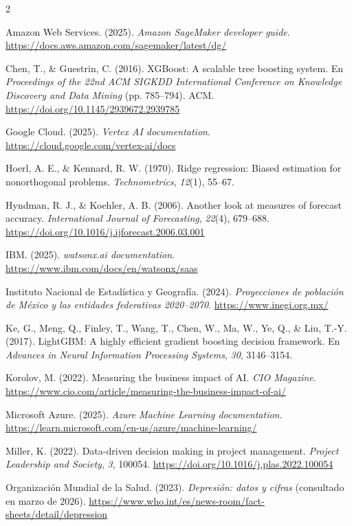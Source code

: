 \documentclass[12pt, letterpaper]{article}
\begin{document}
\begin{multicols}{2}
\small
\setlength{\parindent}{0pt}
\setlength{\hangafter}{1}
\setlength{\parskip}{6pt}
\everypar{\hangindent=1.27cm}

Amazon Web Services. (2025). \textit{Amazon SageMaker developer guide}. \url{https://docs.aws.amazon.com/sagemaker/latest/dg/}

Chen, T., \& Guestrin, C. (2016). XGBoost: A scalable tree boosting system. En \textit{Proceedings of the 22nd ACM SIGKDD International Conference on Knowledge Discovery and Data Mining} (pp. 785--794). ACM. \url{https://doi.org/10.1145/2939672.2939785}

Google Cloud. (2025). \textit{Vertex AI documentation}. \url{https://cloud.google.com/vertex-ai/docs}

Hoerl, A. E., \& Kennard, R. W. (1970). Ridge regression: Biased estimation for nonorthogonal problems. \textit{Technometrics}, \textit{12}(1), 55--67.

Hyndman, R. J., \& Koehler, A. B. (2006). Another look at measures of forecast accuracy. \textit{International Journal of Forecasting}, \textit{22}(4), 679--688. \url{https://doi.org/10.1016/j.ijforecast.2006.03.001}

IBM. (2025). \textit{watsonx.ai documentation}. \url{https://www.ibm.com/docs/en/watsonx/saas}

Instituto Nacional de Estadística y Geografía. (2024). \textit{Proyecciones de población de México y las entidades federativas 2020--2070}. \url{https://www.inegi.org.mx/}

Ke, G., Meng, Q., Finley, T., Wang, T., Chen, W., Ma, W., Ye, Q., \& Liu, T.-Y. (2017). LightGBM: A highly efficient gradient boosting decision framework. En \textit{Advances in Neural Information Processing Systems}, \textit{30}, 3146--3154.

Korolov, M. (2022). Measuring the business impact of AI. \textit{CIO Magazine}. \url{https://www.cio.com/article/measuring-the-business-impact-of-ai/}

Microsoft Azure. (2025). \textit{Azure Machine Learning documentation}. \url{https://learn.microsoft.com/en-us/azure/machine-learning/}

Miller, K. (2022). Data-driven decision making in project management. \textit{Project Leadership and Society}, \textit{3}, 100054. \url{https://doi.org/10.1016/j.plas.2022.100054}

Organización Mundial de la Salud. (2023). \textit{Depresión: datos y cifras} (consultado en marzo de 2026). \url{https://www.who.int/es/news-room/fact-sheets/detail/depression}


\end{multicols}
\end{document}
